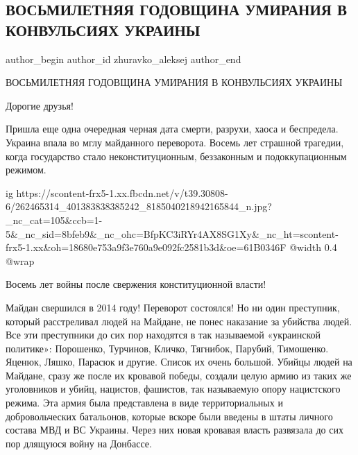  
 
 
 
 
 
\subsection{ВОСЬМИЛЕТНЯЯ ГОДОВЩИНА УМИРАНИЯ В КОНВУЛЬСИЯХ УКРАИНЫ}
\label{sec:29_11_2021.fb.zhuravko_aleksej.1.konvulsii}
 
\ifcmt
 author_begin
   author_id zhuravko_aleksej
 author_end
\fi

ВОСЬМИЛЕТНЯЯ ГОДОВЩИНА УМИРАНИЯ В КОНВУЛЬСИЯХ УКРАИНЫ

Дорогие друзья!

Пришла еще одна очередная черная дата смерти, разрухи, хаоса и беспредела.
Украина впала во мглу майданного переворота. Восемь лет страшной трагедии,
когда государство стало неконституционным, беззаконным и подоккупационным
режимом.

\ifcmt
  ig https://scontent-frx5-1.xx.fbcdn.net/v/t39.30808-6/262465314_401383838385242_8185040218942165844_n.jpg?_nc_cat=105&ccb=1-5&_nc_sid=8bfeb9&_nc_ohc=BfpKC3iRYr4AX8SG1Xy&_nc_ht=scontent-frx5-1.xx&oh=18680e753a9f3e760a9e092fc2581b3d&oe=61B0346F
  @width 0.4
  @wrap 
\fi

Восемь лет войны после свержения конституционной власти! 

Майдан свершился в 2014 году! Переворот состоялся! Но ни один преступник,
который расстреливал людей на Майдане, не понес наказание за убийства людей.
Все эти преступники до сих пор находятся в так называемой «украинской
политике»: Порошенко, Турчинов, Кличко, Тягнибок, Парубий, Тимошенко. Яценюк,
Ляшко, Парасюк и другие. Список их очень большой. Убийцы людей на Майдане,
сразу же после их кровавой победы, создали целую армию из таких же уголовников
и убийц, нацистов, фашистов, так называемую опору нацистского режима. Эта армия
была представлена в виде территориальных и добровольческих батальонов, которые
вскоре были введены в штаты личного состава МВД и ВС Украины. Через них новая
кровавая власть развязала до сих пор длящуюся войну на Донбассе.

